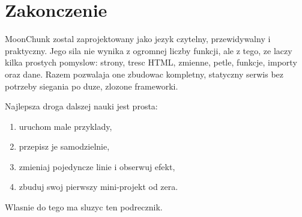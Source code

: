 \documentclass[12pt,a4paper,oneside]{book}
\begin{document}
\tableofcontents

\mainmatter

























\appendix




\backmatter
\chapter*{Zakonczenie}
MoonChunk zostal zaprojektowany jako jezyk czytelny, przewidywalny i praktyczny.
Jego sila nie wynika z ogromnej liczby funkcji, ale z tego, ze laczy kilka prostych
pomyslow: strony, tresc HTML, zmienne, petle, funkcje, importy oraz dane. Razem
pozwalaja one zbudowac kompletny, statyczny serwis bez potrzeby siegania po duze,
zlozone frameworki.

Najlepsza droga dalszej nauki jest prosta:

\begin{enumerate}
  \item uruchom male przyklady,
  \item przepisz je samodzielnie,
  \item zmieniaj pojedyncze linie i obserwuj efekt,
  \item zbuduj swoj pierwszy mini-projekt od zera.
\end{enumerate}

Wlasnie do tego ma sluzyc ten podrecznik.
\end{document}
